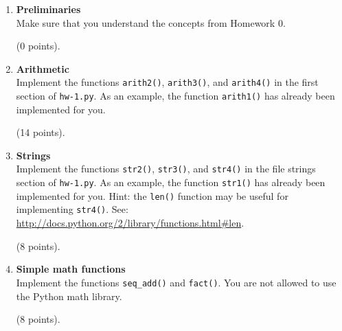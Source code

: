 \documentclass{article}
\newcounter{points}
\newcommand\setpoints[1]{\addtocounter{points}{#1}(#1 points)}
\begin{document}
\begin{enumerate}

\item \textbf{Preliminaries} \\
 Make sure that you understand the concepts from Homework 0. \setpoints{0}.







\item \textbf{Arithmetic} \\
Implement the functions \texttt{arith2()}, \texttt{arith3()}, and \texttt{arith4()} in the first section of \texttt{hw-1.py}.  As an example, the function \texttt{arith1()} has already been implemented for you.  \setpoints{14}.

\item \textbf{Strings} \\
Implement the functions \texttt{str2()}, \texttt{str3()}, and \texttt{str4()} in the file strings section of 
\texttt{hw-1.py}.  As an example, the function \texttt{str1()} has already been implemented for you. Hint: the \texttt{len()} function may be useful for implementing \texttt{str4()}.  See: \url{http://docs.python.org/2/library/functions.html#len}. \setpoints{8}.  

\item \textbf{Simple math functions} \\
Implement the functions \texttt{seq\_add()} and \texttt{fact()}.  
You are not allowed to use the Python math library. \setpoints{8}.

\end{enumerate}
\end{document}
